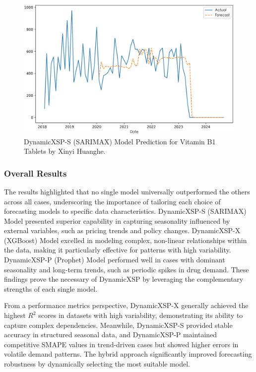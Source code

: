 \documentclass[12pt]{article}
\begin{document}
\begin{itemize}
\begin{figure}[H]
\centering
\includegraphics[width=\linewidth]{../Result_Paper/SARIMAX_Prediction_维生素B1片_信谊黄河.png}
\caption{DynamicXSP-S (SARIMAX) Model Prediction for Vitamin B1 Tablets by Xinyi Huanghe.}
\label{fig:vitaminb1}
\end{figure}
\end{itemize}

\subsubsection{Overall Results}

The results highlighted that no single model universally outperformed the others across all cases, underscoring the importance of tailoring each choice of forecasting models to specific data characteristics. DynamicXSP-S (SARIMAX) Model presented superior capability in capturing seasonality influenced by external variables, such as pricing trends and policy changes. DynamicXSP-X (XGBoost) Model excelled in modeling complex, non-linear relationships within the data, making it particularly effective for patterns with high variability. DynamicXSP-P (Prophet) Model performed well in cases with dominant seasonality and long-term trends, such as periodic spikes in drug demand. These findings prove the necessary of DynamicXSP by leveraging the complementary strengths of each single model. 

From a performance metrics perspective, DynamicXSP-X generally achieved the highest $R^2$ scores in datasets with high variability, demonstrating its ability to capture complex dependencies. Meanwhile, DynamicXSP-S provided stable accuracy in structured seasonal data, and DynamicXSP-P maintained competitive SMAPE values in trend-driven cases but showed higher errors in volatile demand patterns. The hybrid approach significantly improved forecasting robustness by dynamically selecting the most suitable model.
\end{document}
